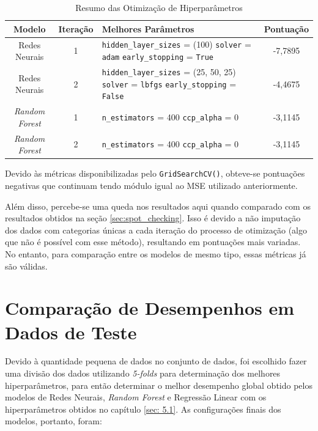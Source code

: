 \documentclass{report}
\let\oldsection\section
\renewcommand\section{\clearpage\oldsection}
\begin{document}
\begin{table}[h!]
  \centering
  \begin{tabular}{| c | c | M{58mm} | c |}
      \hline
      \textbf{Modelo} & \textbf{Iteração} & \textbf{Melhores Parâmetros} & \textbf{Pontuação} \\
      \hline
      Redes Neurais & 1 & \texttt{hidden\_layer\_sizes} = (100) \newline \texttt{solver} = \texttt{adam} \newline \texttt{early\_stopping} = \texttt{True} & -7,7895 \\
      \hline
      Redes Neurais & 2 & \texttt{hidden\_layer\_sizes} = (25, 50, 25) \newline \texttt{solver} = \texttt{lbfgs} \newline \texttt{early\_stopping} = \texttt{False} & -4,4675 \\
      \hline
      \textit{Random Forest} & 1 & \texttt{n\_estimators} = 400 \newline \texttt{ccp\_alpha} = 0 & -3,1145 \\
      \hline
      \textit{Random Forest} & 2 & \texttt{n\_estimators} = 400 \newline \texttt{ccp\_alpha} = 0 & -3,1145 \\
      \hline
  \end{tabular}
  \caption{\label{table:optimization_summary} Resumo das Otimização de Hiperparâmetros}
\end{table}

Devido às métricas disponibilizadas pelo \texttt{GridSearchCV()}, obteve-se pontuações negativas que continuam tendo módulo igual ao MSE utilizado anteriormente.

Além disso, percebe-se uma queda nos resultados aqui quando comparado com os resultados obtidos na seção \ref{sec:spot_checking}. Isso é devido a não imputação dos dados com categorias
únicas a cada iteração do processo de otimização (algo que não é possível com esse método), resultando em pontuações mais variadas. No entanto, para comparação entre os modelos de mesmo
tipo, essas métricas já são válidas.

\section{Comparação de Desempenhos em Dados de Teste}
Devido à quantidade pequena de dados no conjunto de dados, foi escolhido fazer uma divisão dos dados utilizando \textit{5-folds} para determinação dos melhores hiperparâmetros, para então determinar
o melhor desempenho global obtido pelos modelos de Redes Neurais, \textit{Random Forest} e Regressão Linear com os hiperparâmetros obtidos no capítulo \ref{sec: 5.1}. As configurações finais dos
modelos, portanto, foram:
\end{document}
